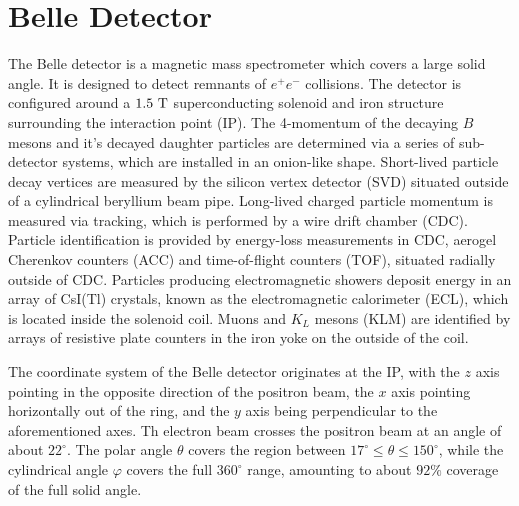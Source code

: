 \section{Belle Detector}
The Belle detector is a magnetic mass spectrometer which covers a large solid angle. It is designed to detect remnants of $e^+e^-$ collisions. The detector is configured around a $1.5\mathrm{~T}$ superconducting solenoid and iron structure surrounding the interaction point (IP). The 4-momentum of the decaying $B$ mesons and it's decayed daughter particles are determined via a series of sub-detector systems, which are installed in an onion-like shape. Short-lived particle decay vertices are measured by the silicon vertex detector (SVD) situated outside of a cylindrical beryllium beam pipe. Long-lived charged particle momentum is measured via tracking, which is performed by a wire drift chamber (CDC). Particle identification is provided by energy-loss measurements in CDC, aerogel Cherenkov counters (ACC) and time-of-flight counters (TOF), situated radially outside of CDC. Particles producing electromagnetic showers deposit energy in an array of CsI(Tl) crystals, known as the electromagnetic calorimeter (ECL), which is located inside the solenoid coil. Muons and $K_L$ mesons (KLM) are identified by arrays of resistive plate counters in the iron yoke on the outside of the coil. 

The coordinate system of the Belle detector originates at the IP, with the $z$ axis pointing in the opposite direction of the positron beam, the $x$ axis pointing horizontally out of the ring, and the $y$ axis being perpendicular to the aforementioned axes. Th electron beam crosses the positron beam at an angle of about $22^\circ$. The polar angle $\theta$ covers the region between $17^\circ \leq \theta \leq 150^\circ$, while the cylindrical angle $\varphi$ covers the full $360^\circ$ range, amounting to about $92\%$ coverage of the full solid angle.




